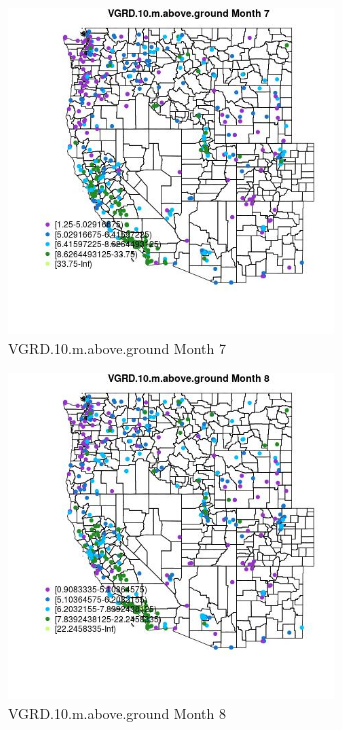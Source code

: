 \begin{figure} 
\centering  
\includegraphics[width=0.77\textwidth]{Code_Outputs/ML_input_report_ML_input_PM25_Step5_part_d_de_duplicated_aves_ML_input_MapObsMo7VGRD10maboveground.jpg} 
\caption{\label{fig:ML_input_report_ML_input_PM25_Step5_part_d_de_duplicated_aves_ML_inputMapObsMo7VGRD10maboveground}VGRD.10.m.above.ground Month 7} 
\end{figure} 
 

\begin{figure} 
\centering  
\includegraphics[width=0.77\textwidth]{Code_Outputs/ML_input_report_ML_input_PM25_Step5_part_d_de_duplicated_aves_ML_input_MapObsMo8VGRD10maboveground.jpg} 
\caption{\label{fig:ML_input_report_ML_input_PM25_Step5_part_d_de_duplicated_aves_ML_inputMapObsMo8VGRD10maboveground}VGRD.10.m.above.ground Month 8} 
\end{figure} 
 

